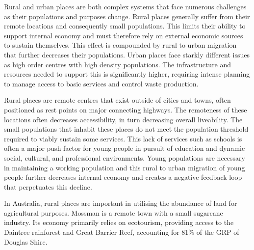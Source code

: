 	Rural and urban places are both complex systems that face numerous challenges as their populations and purposes change. Rural places generally suffer from their remote locations and consequently small populations. This limits their ability to support internal economy and must therefore rely on external economic sources to sustain themselves. This effect is compounded by rural to urban migration that further decreases their populations. Urban places face starkly different issues as high order centres with high density populations. The infrastructure and resources needed to support this is significantly higher, requiring intense planning to manage access to basic services and control waste production.
	
	Rural places are remote centres that exist outside of cities and towns, often positioned as rest points on major connecting highways. The remoteness of these locations often decreases accessibility, in turn decreasing overall liveability. The small populations that inhabit these places do not meet the population threshold required to viably sustain some services. This lack of services such as schools is often a major push factor for young people in pursuit of education and dynamic social, cultural, and professional environments. Young populations are necessary in maintaining a working population and this rural to urban migration of young people further decreases internal economy and creates a negative feedback loop that perpetuates this decline.

	In Australia, rural places are important in utilising the abundance of land for agricultural purposes. Mossman is a remote town with a small sugarcane industry. Its economy primarily relies on ecotourism, providing access to the Daintree rainforest and Great Barrier Reef, accounting for 81\% of the GRP of Douglas Shire.
